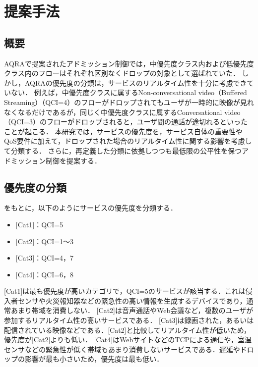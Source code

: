 \documentclass[a4paper,10pt,twocolumn,uplatex]{jsarticle}
\begin{document}
\section{提案手法}

\subsection{概要}
AQRAで提案されたアドミッション制御では，中優先度クラス内および低優先度クラス内のフローはそれぞれ区別なくドロップの対象として選ばれていた．
しかし，AQRAの優先度の分類は，サービスのリアルタイム性を十分に考慮できていない．
例えば，中優先度クラスに属するNon-conversational video（Buffered Streaming）（QCI=4）のフローがドロップされてもユーザが一時的に映像が見れなくなるだけであるが，同じく中優先度クラスに属するConversational video（QCI=3）のフローがドロップされると，ユーザ間の通話が途切れるといったことが起こる．
本研究では，サービスの優先度を，サービス自体の重要性やQoS要件に加えて，ドロップされた場合のリアルタイム性に関する影響を考慮して分類する．
さらに，再定義した分類に依拠しつつも最低限の公平性を保つアドミッション制御を提案する．\par

\subsection{優先度の分類}
をもとに，以下のようにサービスの優先度を分類する．\par
\begin{itemize}
  \item $[$Cat1$]$：QCI=5
  \item $[$Cat2$]$：QCI=1〜3
  \item $[$Cat3$]$：QCI=4，7
  \item $[$Cat4$]$：QCI=6，8
\end{itemize}

[Cat1]は最も優先度が高いカテゴリで，QCI=5のサービスが該当する．これは侵入者センサや火災報知器などの緊急性の高い情報を生成するデバイスであり，通常あまり帯域を消費しない．
[Cat2]は音声通話やWeb会議など，複数のユーザが参加するリアルタイム性の高いサービスである．
[Cat3]は録画された，あるいは配信されている映像などである．[Cat2]と比較してリアルタイム性が低いため，優先度が[Cat2]よりも低い．
[Cat4]はWebサイトなどのTCPによる通信や，室温センサなどの緊急性が低く帯域もあまり消費しないサービスである．遅延やドロップの影響が最も小さいため，優先度は最も低い．
\end{document}
